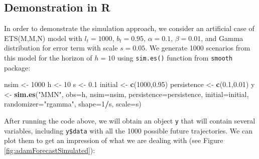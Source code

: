 \documentclass[]{book}
\newenvironment{Shaded}{\begin{snugshade}}{\end{snugshade}}
\newcommand{\DataTypeTok}[1]{\textcolor[rgb]{0.13,0.29,0.53}{#1}}
\newcommand{\DecValTok}[1]{\textcolor[rgb]{0.00,0.00,0.81}{#1}}
\newcommand{\FloatTok}[1]{\textcolor[rgb]{0.00,0.00,0.81}{#1}}
\newcommand{\KeywordTok}[1]{\textcolor[rgb]{0.13,0.29,0.53}{\textbf{#1}}}
\newcommand{\NormalTok}[1]{#1}
\newcommand{\OperatorTok}[1]{\textcolor[rgb]{0.81,0.36,0.00}{\textbf{#1}}}
\newcommand{\StringTok}[1]{\textcolor[rgb]{0.31,0.60,0.02}{#1}}
\theoremstyle{definition}
\theoremstyle{definition}
\theoremstyle{definition}
\theoremstyle{definition}
\theoremstyle{remark}
\begin{document}
\hypertarget{scenariosExample}{%
\subsection{Demonstration in R}\label{scenariosExample}}

In order to demonstrate the simulation approach, we consider an artificial case of ETS(M,M,N) model with \(l_t=1000\), \(b_t=0.95\), \(\alpha=0.1\), \(\beta=0.01\), and Gamma distribution for error term with scale \(s=0.05\). We generate 1000 scenarios from this model for the horizon of \(h=10\) using \texttt{sim.es()} function from \texttt{smooth} package:

\begin{Shaded}
\begin{Highlighting}[]
\NormalTok{nsim <-}\StringTok{ }\DecValTok{1000}
\NormalTok{h <-}\StringTok{ }\DecValTok{10}
\NormalTok{s <-}\StringTok{ }\FloatTok{0.1}
\NormalTok{initial <-}\StringTok{ }\KeywordTok{c}\NormalTok{(}\DecValTok{1000}\NormalTok{,}\FloatTok{0.95}\NormalTok{)}
\NormalTok{persistence <-}\StringTok{ }\KeywordTok{c}\NormalTok{(}\FloatTok{0.1}\NormalTok{,}\FloatTok{0.01}\NormalTok{)}
\NormalTok{y <-}\StringTok{ }\KeywordTok{sim.es}\NormalTok{(}\StringTok{"MMN"}\NormalTok{, }\DataTypeTok{obs=}\NormalTok{h, }\DataTypeTok{nsim=}\NormalTok{nsim, }\DataTypeTok{persistence=}\NormalTok{persistence,}
            \DataTypeTok{initial=}\NormalTok{initial, }\DataTypeTok{randomizer=}\StringTok{"rgamma"}\NormalTok{,}
            \DataTypeTok{shape=}\DecValTok{1}\OperatorTok{/}\NormalTok{s, }\DataTypeTok{scale=}\NormalTok{s)}
\end{Highlighting}
\end{Shaded}

After running the code above, we will obtain an object \texttt{y} that will contain several variables, including \texttt{y\$data} with all the 1000 possible future trajectories. We can plot them to get an impression of what we are dealing with (see Figure \ref{fig:adamForecastSimulated}):
\end{document}
